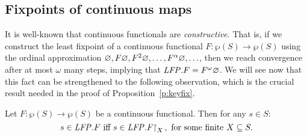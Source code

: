 
\subsection{Fixpoints of continuous maps}

It is well-known that continuous functionals are \emph{constructive}.
That is, if we construct the least fixpoint of a continuous functional $F: 
\wp(S) \to \wp(S)$ using the ordinal approximation $\varnothing, F\varnothing, F^2\varnothing, 
\ldots, F^{\alpha}\varnothing, \ldots$, then we reach convergence after at most $\omega$
many steps, implying that $\mathit{LFP}. F = F^{\omega}\varnothing$.
We will see now that this fact can be strengthened to the following observation,
which is the crucial result needed in the proof of Proposition~\ref{p:keyfix}.

\begin{theorem}
\label{t:fixcont}
Let $F: \wp(S)\to \wp(S)$ be a continuous functional.
Then for any $s \in S$:
\begin{equation}
\label{eq:fixcont}
s \in \LFP. F \text{ iff }
s \in \LFP.F\rst{X}, \text{ for some finite } X \subseteq S.
\end{equation}
\end{theorem}

